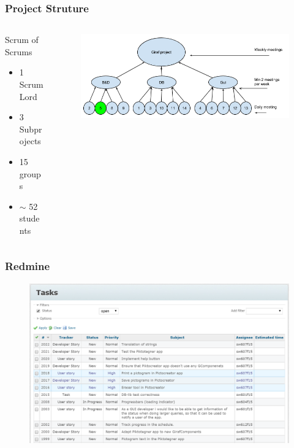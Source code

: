 \begin{frame}
	\begin{center}
		\frametitle{Project Struture}
		\begin{columns} %
			\begin{column}{.3\textwidth}
				Scrum of Scrums
				\begin{itemize}
					\item 1 Scrum Lord
					\item 3 Subprojects
					\item 15 groups
					\item $\sim$ 52 students
				\end{itemize}
			\end{column}%
			\begin{column}{.80\textwidth}
				\begin{figure}[H]
					\centering
					\includegraphics[width= 0.8 \textwidth]{pictures/ScrumOfScrum.png}
				\end{figure}
			\end{column}%
		\end{columns}
	\end{center}
\end{frame}

\begin{frame}
	\begin{center}
		\frametitle{Redmine}
		\begin{figure}[H]
			\centering
			\includegraphics[width= 0.8 \textwidth]{pictures/RedmineStory.png}
		\end{figure}
	\end{center}
\end{frame}

